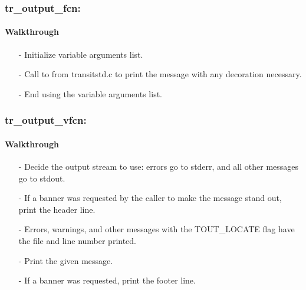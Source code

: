 \documentclass[letterpaper,12pt]{article}
\begin{document}
 \newline

 \newline

 \newline

 \newline

\subsubsection{tr\_output\_fcn:}
\paragraph{Walkthrough}
\begin{enumerate}[leftmargin=10pt, noitemsep, parsep=0pt, topsep=0ex]
\item[-] Initialize variable arguments list.
\item[-] Call to  from transitstd.c to print the message with any decoration necessary.
\item[-] End using the variable arguments list.
\end{enumerate}

\subsubsection{tr\_output\_vfcn:}
\paragraph{Walkthrough}
\begin{enumerate}[leftmargin=10pt, noitemsep, parsep=0pt, topsep=0ex]
\item[-] Decide the output stream to use: errors go to stderr, and all other messages go to stdout.
\item[-] If a banner was requested by the caller to make the message stand out, print the header line.
\item[-] Errors, warnings, and other messages with the TOUT\_LOCATE flag have the file and line number printed.
\item[-] Print the given message.
\item[-] If a banner was requested, print the footer line.
\end{enumerate}
\end{document}
